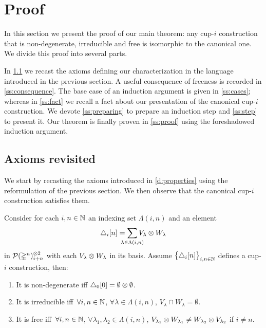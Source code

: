 
\section{Proof}\label{s:proof}

In this section we present the proof of our main theorem: any \mbox{cup-$i$} construction that is non-degenerate, irreducible and free is isomorphic to the canonical one.
We divide this proof into several parts.

In \cref{ss:properties} we recast the axioms defining our characterization in the language introduced in the previous section.
A useful consequence of freeness is recorded in \cref{ss:consequence}.
The base case of an induction argument is given in \cref{ss:cases}; whereas in
\cref{ss:fact} we recall a fact about our presentation of the canonical cup-$i$ construction.
We devote \cref{ss:preparing} to prepare an induction step and \cref{ss:step} to present it.
Our theorem is finally proven in \cref{ss:proof} using the foreshadowed induction argument.

\subsection{Axioms revisited}\label{ss:properties}

We start by recasting the axioms introduced in \cref{d:properties} using the reformulation of the previous section.
We then observe that the canonical cup-$i$ construction satisfies them.

\begin{lemma}\label{l:properties}
	Consider for each $i,n \in \mathbb{N}$ an indexing set $\Lambda(i,n)$ and an element
	\[
	\triangle_i [n] =
	\sum_{\mathclap{\lambda \in \Lambda(i,n)}} V_\lambda \ot W_\lambda
	\]
	in $\mathcal{P}(\mathbb{\Delta}^n)^{\otimes 2}_{i+n}$ with each $V_\lambda \otimes W_\lambda$ in its basis.
	Assume $\big\{ \triangle_i [n] \big\}_{i,n \in \mathbb{N}}$ defines a \mbox{cup-$i$} construction, then:
	\begin{enumerate}
		\item It is non-degenerate iff
		$\triangle_0 [0] = \emptyset \otimes \emptyset$.
		\item It is irreducible iff\,
		$\forall i,n \in \mathbb{N}$, $\forall \lambda \in \Lambda(i,n)$, $V_\lambda \cap W_\lambda = \emptyset$.
		\item \label{i:free} It is free iff\,
		$\forall i,n \in \mathbb{N}$, $\forall \lambda_1, \lambda_2 \in \Lambda(i,n)$, $V_{\lambda_1} \otimes W_{\lambda_1} \neq W_{\lambda_2} \otimes V_{\lambda_2}$ if $i \neq n$.
	\end{enumerate}
\end{lemma}

